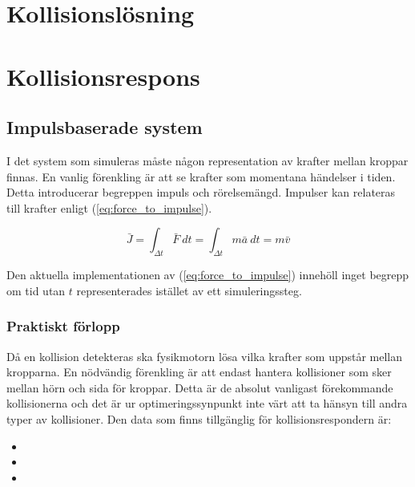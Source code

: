 \documentclass[a4paper,12pt,twopage,swedish]{article}
\begin{document}
\section{Kollisionslösning}
\section{Kollisionsrespons}
\subsection{Impulsbaserade system}
I det system som simuleras måste någon representation av krafter mellan kroppar finnas. En vanlig förenkling är att se krafter som momentana händelser i tiden. Detta introducerar begreppen impuls och rörelsemängd. Impulser kan relateras till krafter enligt (\ref{eq:force_to_impulse}).

\begin{equation}\label{eq:force_to_impulse}
\bar{J} = \int_{\Delta t}^{} \bar{F} \ dt = \int_{\Delta t}^{} m\bar{a} \ dt = m\bar{v}
\end{equation}

Den aktuella implementationen av (\ref{eq:force_to_impulse}) innehöll inget begrepp om tid utan $t$ representerades istället av ett simuleringssteg.

\subsubsection{Praktiskt förlopp}
Då en kollision detekteras ska fysikmotorn lösa vilka krafter som uppstår mellan kropparna. En nödvändig förenkling är att endast hantera kollisioner som sker mellan hörn och sida för kroppar. Detta är de absolut vanligast förekommande kollisionerna och det är ur optimeringssynpunkt inte värt att ta hänsyn till andra typer av kollisioner. Den data som finns tillgänglig för kollisionsrespondern är:

\begin{itemize}
\item {}
\item {}
\item {}
\end{itemize}
\end{document}
